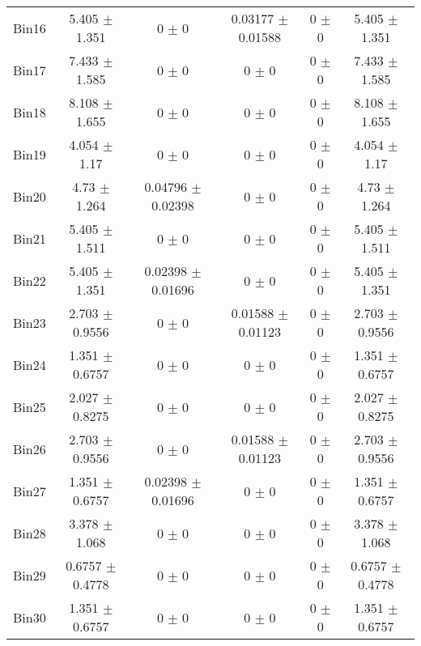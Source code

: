 \begin{tabular}{@{\extracolsep{4pt}}lccccc@{}}
     Bin16 & 5.405 $\pm$ 1.351 & 0 $\pm$ 0 & 0.03177 $\pm$ 0.01588 & 0 $\pm$ 0 & 5.405 $\pm$ 1.351 \\ 
     Bin17 & 7.433 $\pm$ 1.585 & 0 $\pm$ 0 & 0 $\pm$ 0 & 0 $\pm$ 0 & 7.433 $\pm$ 1.585 \\ 
     Bin18 & 8.108 $\pm$ 1.655 & 0 $\pm$ 0 & 0 $\pm$ 0 & 0 $\pm$ 0 & 8.108 $\pm$ 1.655 \\ 
     Bin19 & 4.054 $\pm$ 1.17 & 0 $\pm$ 0 & 0 $\pm$ 0 & 0 $\pm$ 0 & 4.054 $\pm$ 1.17 \\ 
     Bin20 & 4.73 $\pm$ 1.264 & 0.04796 $\pm$ 0.02398 & 0 $\pm$ 0 & 0 $\pm$ 0 & 4.73 $\pm$ 1.264 \\ 
     Bin21 & 5.405 $\pm$ 1.511 & 0 $\pm$ 0 & 0 $\pm$ 0 & 0 $\pm$ 0 & 5.405 $\pm$ 1.511 \\ 
     Bin22 & 5.405 $\pm$ 1.351 & 0.02398 $\pm$ 0.01696 & 0 $\pm$ 0 & 0 $\pm$ 0 & 5.405 $\pm$ 1.351 \\ 
     Bin23 & 2.703 $\pm$ 0.9556 & 0 $\pm$ 0 & 0.01588 $\pm$ 0.01123 & 0 $\pm$ 0 & 2.703 $\pm$ 0.9556 \\ 
     Bin24 & 1.351 $\pm$ 0.6757 & 0 $\pm$ 0 & 0 $\pm$ 0 & 0 $\pm$ 0 & 1.351 $\pm$ 0.6757 \\ 
     Bin25 & 2.027 $\pm$ 0.8275 & 0 $\pm$ 0 & 0 $\pm$ 0 & 0 $\pm$ 0 & 2.027 $\pm$ 0.8275 \\ 
     Bin26 & 2.703 $\pm$ 0.9556 & 0 $\pm$ 0 & 0.01588 $\pm$ 0.01123 & 0 $\pm$ 0 & 2.703 $\pm$ 0.9556 \\ 
     Bin27 & 1.351 $\pm$ 0.6757 & 0.02398 $\pm$ 0.01696 & 0 $\pm$ 0 & 0 $\pm$ 0 & 1.351 $\pm$ 0.6757 \\ 
     Bin28 & 3.378 $\pm$ 1.068 & 0 $\pm$ 0 & 0 $\pm$ 0 & 0 $\pm$ 0 & 3.378 $\pm$ 1.068 \\ 
     Bin29 & 0.6757 $\pm$ 0.4778 & 0 $\pm$ 0 & 0 $\pm$ 0 & 0 $\pm$ 0 & 0.6757 $\pm$ 0.4778 \\ 
     Bin30 & 1.351 $\pm$ 0.6757 & 0 $\pm$ 0 & 0 $\pm$ 0 & 0 $\pm$ 0 & 1.351 $\pm$ 0.6757 \\ 
\hline\hline
  \end{tabular}
